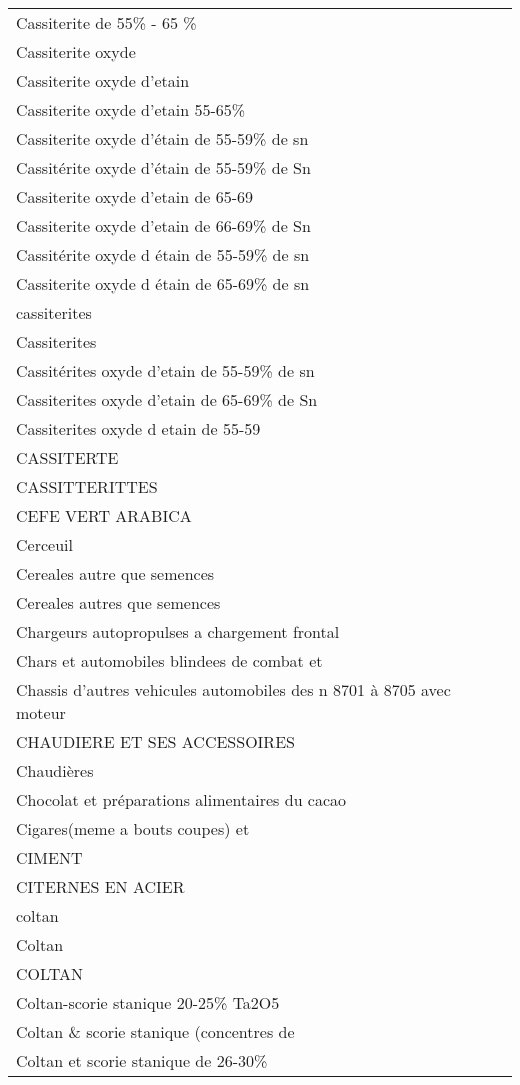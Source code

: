 \documentclass[
]{book}
\begin{document}
\begin{longtable}[t]{l}
\addlinespace
Cassiterite de 55\% - 65 \%\\
Cassiterite oxyde\\
Cassiterite oxyde d'etain\\
Cassiterite oxyde d'etain 55-65\%\\
Cassiterite oxyde d'étain de 55-59\% de sn\\
\addlinespace
Cassitérite oxyde d'étain de 55-59\% de Sn\\
Cassiterite oxyde d'etain de 65-69\\
Cassiterite oxyde d'etain de 66-69\% de Sn\\
Cassitérite oxyde d étain de 55-59\% de sn\\
Cassiterite oxyde d étain de 65-69\% de sn\\
\addlinespace
cassiterites\\
Cassiterites\\
Cassitérites oxyde d'etain de 55-59\% de sn\\
Cassiterites oxyde d'etain de 65-69\% de Sn\\
Cassiterites oxyde d etain de 55-59\\
\addlinespace
CASSITERTE\\
CASSITTERITTES\\
CEFE VERT ARABICA\\
Cerceuil\\
Cereales autre que semences\\
\addlinespace
Cereales autres que semences\\
Chargeurs autopropulses a chargement frontal\\
Chars et automobiles blindees de combat et\\
Chassis d'autres vehicules automobiles des n 8701 à 8705 avec moteur\\
CHAUDIERE ET SES ACCESSOIRES\\
\addlinespace
Chaudières\\
Chocolat et préparations alimentaires du cacao\\
Cigares(meme a bouts coupes) et\\
CIMENT\\
CITERNES EN ACIER\\
\addlinespace
coltan\\
Coltan\\
COLTAN\\
Coltan-scorie stanique 20-25\% Ta2O5\\
Coltan \& scorie stanique (concentres de\\
\addlinespace
Coltan et scorie stanique de 26-30\%\\

\end{longtable}
\end{document}
